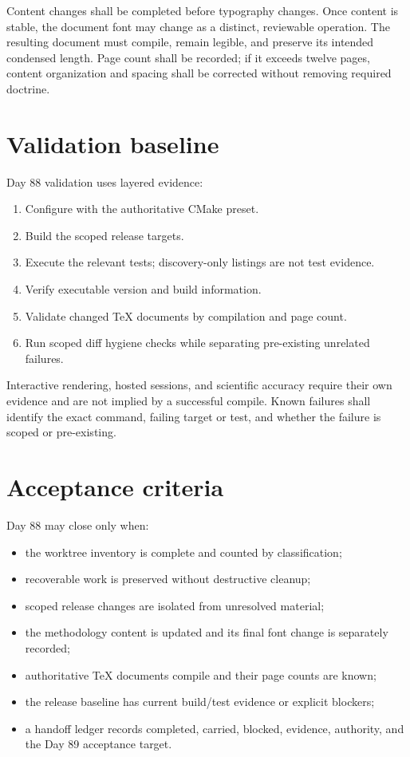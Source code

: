 \documentclass[10pt]{article}
\begin{document}
Content changes shall be completed before typography changes. Once content is stable, the document font may change as a distinct, reviewable operation. The resulting document must compile, remain legible, and preserve its intended condensed length. Page count shall be recorded; if it exceeds twelve pages, content organization and spacing shall be corrected without removing required doctrine.

\section*{Validation baseline}
Day 88 validation uses layered evidence:

\begin{enumerate}
\item Configure with the authoritative CMake preset.
\item Build the scoped release targets.
\item Execute the relevant tests; discovery-only listings are not test evidence.
\item Verify executable version and build information.
\item Validate changed TeX documents by compilation and page count.
\item Run scoped diff hygiene checks while separating pre-existing unrelated failures.
\end{enumerate}

Interactive rendering, hosted sessions, and scientific accuracy require their own evidence and are not implied by a successful compile. Known failures shall identify the exact command, failing target or test, and whether the failure is scoped or pre-existing.

\section*{Acceptance criteria}
Day 88 may close only when:

\begin{itemize}
\item the worktree inventory is complete and counted by classification;
\item recoverable work is preserved without destructive cleanup;
\item scoped release changes are isolated from unresolved material;
\item the methodology content is updated and its final font change is separately recorded;
\item authoritative TeX documents compile and their page counts are known;
\item the release baseline has current build/test evidence or explicit blockers;
\item a handoff ledger records completed, carried, blocked, evidence, authority, and the Day 89 acceptance target.
\end{itemize}
\end{document}
